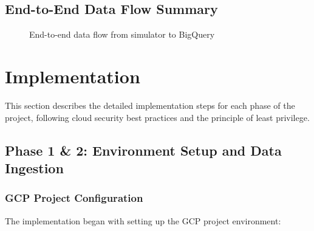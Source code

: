 \documentclass[12pt,a4paper]{article}
\begin{document}
\subsection{End-to-End Data Flow Summary}

\begin{figure}[H]
\centering
{}
\caption{End-to-end data flow from simulator to BigQuery}
\end{figure}

\section{Implementation}

This section describes the detailed implementation steps for each phase of the project, following cloud security best practices and the principle of least privilege.

\subsection{Phase 1 \& 2: Environment Setup and Data Ingestion}

\subsubsection{GCP Project Configuration}

The implementation began with setting up the GCP project environment:
\end{document}
